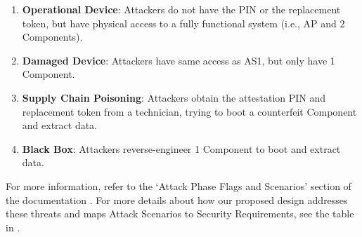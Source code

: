 \begin{enumerate}[label={\textbf{(AS\arabic*)}}, leftmargin=0.55in]
\item \textbf{Operational Device}: Attackers do not have the PIN or the replacement token, but have physical access to a fully functional system (i.e., AP and 2 Components).

\item \textbf{Damaged Device}: Attackers have same access as AS1, but only have 1 Component.

\item \textbf{Supply Chain Poisoning}: Attackers obtain the attestation PIN and replacement token from a technician, trying to boot a counterfeit Component and extract data.

\item \textbf{Black Box}: Attackers reverse-engineer 1 Component to boot and extract data.
\end{enumerate}

For more information, refer to the `Attack Phase Flags and Scenarios' section of the documentation \cite{eCTFOfficial}. For more details about how our proposed design addresses these threats and maps Attack Scenarios to Security Requirements, see the table in . 






